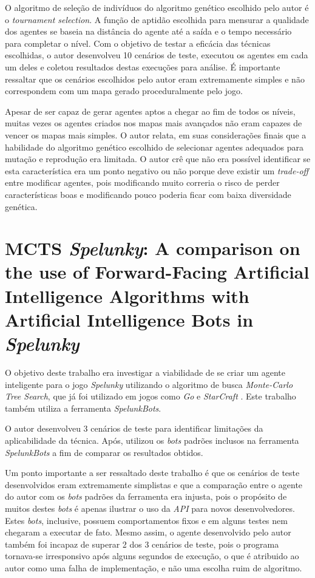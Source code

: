 O algoritmo de seleção de indivíduos do algoritmo genético escolhido pelo autor
é o \textit{tournament selection}. A função de aptidão escolhida para mensurar a
qualidade dos agentes se baseia na distância do agente até a saída e o tempo
necessário para completar o nível. Com o objetivo de testar a eficácia das
técnicas escolhidas, o autor desenvolveu 10 cenários de teste, executou os
agentes em cada um deles e coletou resultados destas execuções para análise. É
importante ressaltar que os cenários escolhidos pelo autor eram extremamente
simples e não correspondem com um mapa gerado proceduralmente pelo jogo.

Apesar de ser capaz de gerar agentes aptos a chegar ao fim de todos os níveis,
muitas vezes os agentes criados nos mapas mais avançados não eram capazes de
vencer os mapas mais simples. O autor relata, em suas considerações finais que a
habilidade do algoritmo genético escolhido de selecionar agentes adequados para
mutação e reprodução era limitada. O autor crê que não era possível identificar
se esta característica era um ponto negativo ou não porque deve existir um
\textit{trade-off} entre modificar agentes, pois modificando muito correria o
risco de perder características boas e modificando pouco poderia ficar com baixa
diversidade genética. 


\section{MCTS \textit{Spelunky}: A comparison on the use of Forward-Facing
Artificial Intelligence Algorithms with Artificial Intelligence Bots in
\textit{Spelunky}}
O objetivo deste trabalho era investigar a viabilidade de se criar um agente
inteligente para o jogo \textit{Spelunky} utilizando o algoritmo de busca
\textit{Monte-Carlo Tree Search}, que já foi utilizado em jogos como \textit{Go}
e \textit{StarCraft} \cite{spelunky_mcts}. Este trabalho também utiliza a
ferramenta \textit{SpelunkBots}.

O autor desenvolveu 3 cenários de teste para identificar limitações da
aplicabilidade da técnica. Após, utilizou os \textit{bots} padrões inclusos na
ferramenta \textit{SpelunkBots} a fim de comparar os resultados obtidos. 

Um ponto importante a ser ressaltado deste trabalho é que os cenários de teste
desenvolvidos eram extremamente simplistas e que a comparação entre o agente do
autor com os \textit{bots} padrões da ferramenta era injusta, pois o propósito
de muitos destes \textit{bots} é apenas ilustrar o uso da \textit{API} para
novos desenvolvedores. Estes \textit{bots}, inclusive, possuem comportamentos
fixos e em alguns testes nem chegaram a executar de fato. Mesmo assim, o agente
desenvolvido pelo autor também foi incapaz de superar 2 dos 3 cenários de teste,
pois o programa tornava-se irresponsivo após alguns segundos de execução, o que
é atribuido ao autor como uma falha de implementação, e não uma escolha ruim de
algoritmo.


